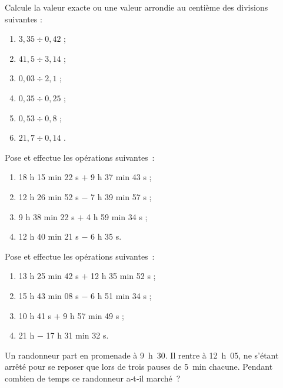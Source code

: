\begin{exercice} 
Calcule la valeur exacte ou une valeur arrondie au centième des divisions suivantes :
\begin{enumerate} 
 \item $3,35 \div 0,42$ \dotfill ; 

 \item $41,5 \div 3,14$ \dotfill ; 

 \item $ 0,03 \div 2,1$ \dotfill ; 

 \item $0,35 \div 0,25$ \dotfill ; 

 \item $0,53 \div 0,8$ \dotfill ; 

 \item $21,7 \div 0,14$ \dotfill. 
 \end{enumerate}
\end{exercice}




\begin{exercice}
Pose et effectue les opérations suivantes :
\begin{enumerate} 
 \item 18 h 15 min 22 s $+$ 9 h 37 min 43 s ;
 \item 12 h 26 min 52 s $-$ 7 h 39 min 57 s ;
 \item 9 h 38 min 22 s $+$ 4 h 59 min 34 s ;
 \item 12 h 40 min 21 s $-$ 6 h 35 s.
 \end{enumerate}
\end{exercice}


\begin{exercice}
Pose et effectue les opérations suivantes :
\begin{enumerate} 
 \item 13 h 25 min 42 s $+$ 12 h 35 min 52 s ;
 \item 15 h 43 min 08 s $-$ 6 h 51 min 34 s ;
 \item 10 h 41 s $+$ 9 h 57 min 49 s ;
 \item 21 h $-$ 17 h 31 min 32 s.
 \end{enumerate}
\end{exercice}


\begin{exercice}
Un randonneur part en promenade à 9 h 30. Il rentre à 12 h 05, ne s'étant arrêté pour se reposer que lors de trois pauses de 5 min chacune. Pendant combien de temps ce randonneur a‑t‑il marché ?
\end{exercice}


